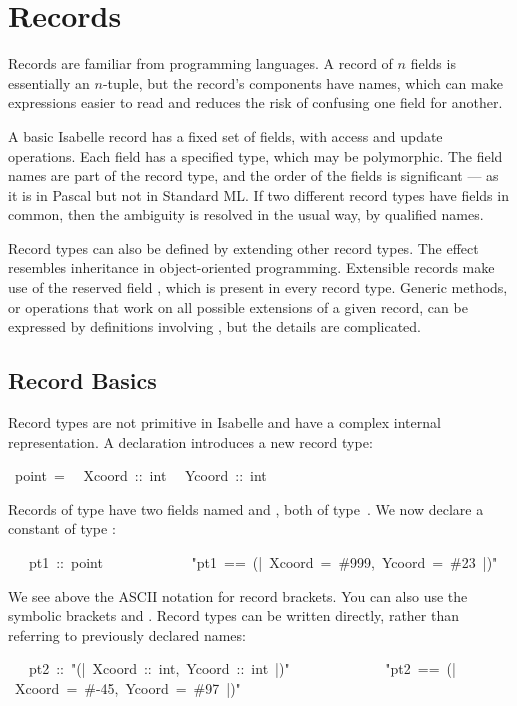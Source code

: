\section{Records} 
\label{sec:records}

Records are familiar from programming languages.  A record of $n$
fields is essentially an $n$-tuple, but the record's components have
names, which can make expressions easier to read and reduces the risk
of confusing one field for another.

A basic Isabelle record has a fixed set of fields, with access
and update operations.  Each field has a specified type, which may be
polymorphic.  The field names are part of the record type, and the
order of the fields is significant --- as it is in Pascal but not in
Standard ML.  If two different record types have fields in common,
then the ambiguity is resolved in the usual way, by qualified names.

Record types can also be defined by extending other record types. 
The effect resembles inheritance in object-oriented programming. 
Extensible records make use of the reserved field , which is
present in every record type.  Generic methods, or operations that
work on all possible extensions of a given record, can be expressed by
definitions involving , but the details are complicated.

\subsection{Record Basics}

Record types are not primitive in Isabelle and have a complex internal
representation.  A  declaration
introduces a new record type:
\begin{isabelle}
\ point\ =\isanewline
\ \ Xcoord\ ::\ int\isanewline
\ \ Ycoord\ ::\ int
\end{isabelle}

Records of type  have two fields named  and ,
both of type~.  We now declare a constant of type
:
\begin{isabelle}
\ \ \ pt1\ ::\ point\isanewline
\ \ \ \ \ \ \ \ \ \ \ \ "pt1\ ==\ (|\ Xcoord\ =\ \#999,\ Ycoord\ =\ \#23\ |)"
\end{isabelle}
We see above the ASCII notation for record brackets.  You can also use
the symbolic brackets \isa{\isasymlparr} and  \isa{\isasymrparr}.
Record types can be written directly, rather than referring to
previously declared names: 
\begin{isabelle}
\ \ \ pt2\ ::\ "(|\ Xcoord\ ::\ int,\ Ycoord\ ::\ int\
|)"\ \isanewline
\ \ \ \ \ \ \ \ \ \ \ \ "pt2\ ==\ (|\ Xcoord\ =\ \#-45,\ Ycoord\ =\ \#97\ |)"
\end{isabelle}

